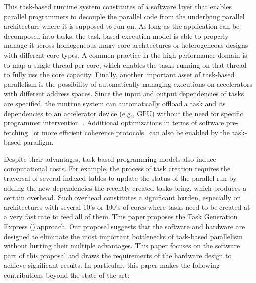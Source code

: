 This task-based runtime system constitutes of a software layer that enables parallel programmers to decouple the parallel code from the underlying parallel architecture where it is supposed to run on.
As long as the application can be decomposed into tasks, the task-based execution model is able to properly manage it across homogeneous many-core architectures or heterogeneous designs with different core types. 
A common practice in the high performance domain is to map a single thread per core, which enables the tasks running on that thread to fully use the core capacity. 
Finally, another important asset of task-based parallelism is the possibility of automatically managing executions on accelerators with different address spaces. 
Since the input and output dependencies of tasks are specified, the runtime system can automatically offload a task and its dependencies to an accelerator device (e.g., GPU) without the need for specific programmer intervention~\cite{Bueno:IPDPS2012}.
Additional optimizations in terms of software pre-fetching~\cite{Papaefstathiou2013} or more efficient coherence protocols~\cite{Manivannan2014} can also be enabled by the task-based paradigm.

Despite their advantages, task-based programming models also induce computational costs.
For example, the process of task creation requires the traversal of several indexed tables to update the status of the parallel run by adding the new dependencies the recently created tasks bring, which produces a certain overhead.
Such overhead constitutes a significant burden, especially on architectures with several 10's or 100's of cores where tasks need to be created at a very fast rate to feed all of them.
This paper proposes the Task Generation Express ({\proposal}) approach. 
Our proposal suggests that the software and hardware are designed to eliminate the most important bottlenecks of task-based parallelism without hurting their multiple advantages. 
This paper focuses on the software part of this proposal and draws the requirements of the hardware design to achieve significant results.
In particular, this paper makes the following contributions beyond the state-of-the-art:

